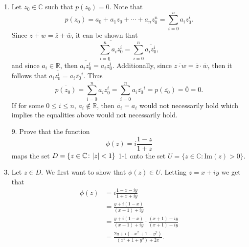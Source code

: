 \documentclass[12pt]{article}
\makeatletter
\theoremstyle{definition}
\theoremstyle{remark}
\renewenvironment{proof}[1][\proofname]{\par
  \pushQED{\qed}%
  \normalfont \topsep6\p@\@plus6\p@\relax
  \list{}{\leftmargin=0mm
          \rightmargin=4mm
          \settowidth{\itemindent}{\itshape#1}%
          \labelwidth=\itemindent
          \parsep=0pt \listparindent=\parindent 
  }
  \item[\hskip\labelsep
        \itshape
    #1\@addpunct{.}]\ignorespaces
}{%
  \popQED\endlist\@endpefalse
}
\let\oldproofname=\proofname
\renewcommand{\proofname}{\bf{\textit{\oldproofname}}}
\makeatother
\begin{document}
\begin{enumerate}[leftmargin=*]
\begin{proof}
                Let $z_0\in\mathbb{C}$ such that $p(z_0)=0$. Note that
                    \begin{equation*}
                        p(z_0)=a_0+a_1z_0+\cdots+a_nz_0^n=\sum_{i=0}^n a_iz_0^i.
                    \end{equation*}
                Since $\overline{z+w}=\overline{z}+\overline{w}$, it can be shown that
                    \begin{equation*}
                        \overline{\sum_{i=0}^na_iz_0^i}=\sum_{i=0}^n\overline{a_iz_0^i},
                    \end{equation*}
                and since $a_i\in\mathbb{R}$, then $\overline{a_iz_0^i}=a_i\overline{z_0^i}$. Additionally, since $\overline{z\cdot w}=\overline{z}\cdot\overline{w}$, then it follows that $a_i\overline{z_0^i}=a_i\overline{z_0}^i$. Thus
                    \begin{equation*}
                        \overline{p(z_0)}=\overline{\sum_{i=0}^na_iz_0^i}=\sum_{i=0}^na_i\overline{z_0}^i=p(\overline{z_0})=\overline{0}=0.
                    \end{equation*}
                If for some $0\leq i\leq n$, $a_i\notin\mathbb{R}$, then $\overline{a_i}=a_i$ would not necessarily hold which implies the equalities above would not necessarily hold.
            \end{proof}
        \item[9.] 
            Prove that the function
                \begin{equation*}
                    \phi(z)=i\frac{1-z}{1+z}
                \end{equation*}
            maps the set $D=\{z\in\mathbb{C}\colon\abs{z}<1\}$ 1-1 onto the set $U=\{z\in\mathbb{C}\colon\text{Im}(z)>0\}$.
                \begin{proof}
                    Let $z\in D$. We first want to show that $\phi(z)\in U$. Letting $z=x+iy$ we get that 
                        \begin{equation*}
                            \begin{split}
                                \phi(z)&=i\frac{1-x-iy}{1+x+iy} \\
                                &= \frac{y+i(1-x)}{(x+1)+iy} \\
                                &= \frac{y+i(1-x)}{(x+1)+iy}\cdot\frac{(x+1)-iy}{(x+1)-iy} \\
                                &= \frac{2y+i(-x^2+1-y^2)}{(x^2+1+y^2)+2x}.
                            \end{split}

\end{equation*}
\end{proof}
\end{enumerate}
\end{document}
